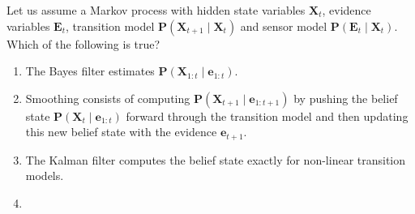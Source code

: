 \documentclass[11pt, a4paper]{exam}
\begin{document}
\begin{quiz}
    \item Let us assume a Markov process with hidden state variables $\mathbf{X}_t$, evidence variables $\mathbf{E}_t$, transition model $\mathbf{P}(\mathbf{X}_{t+1} \mid \mathbf{X}_t)$ and sensor model $\mathbf{P}(\mathbf{E}_{t} \mid \mathbf{X}_t)$. Which of the following is true?
    \begin{enumerate}[label=$\bigcirc$]
        \item The Bayes filter estimates $\mathbf{P}(\mathbf{X}_{1:t} \mid \mathbf{e}_{1:t})$.
        \item Smoothing consists of computing $\mathbf{P}(\mathbf{X}_{t+1} \mid \mathbf{e}_{1:t+1})$ by pushing the belief state $\mathbf{P}(\mathbf{X}_t \mid \mathbf{e}_{1:t})$ forward through the transition model and then updating this new belief state with the evidence $\mathbf{e}_{t+1}$.
        \item The Kalman filter computes the belief state exactly for non-linear transition models.
        \item {}
    \end{enumerate}
\end{quiz}
\end{document}
